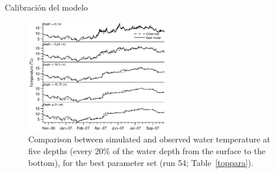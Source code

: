 \documentclass[
10pt,
aspectratio=169,
]{beamer}
\begin{document}
\begin{frame}{Calibraci\'on del modelo}
\vspace{-0.2cm}
\begin{figure}[!htbp]
  \begin{center}
      \includegraphics[width=0.55\textwidth]{bestParaNew}
    \caption{\tiny Comparison between simulated and observed water temperature at five depths (every 20\% of the water depth from the surface to the bottom), for the best parameter set  (run 54; Table~\ref{toppara}).}
    \label{bestPara}
  \end{center}
\end{figure}
\end{frame}
\end{document}
